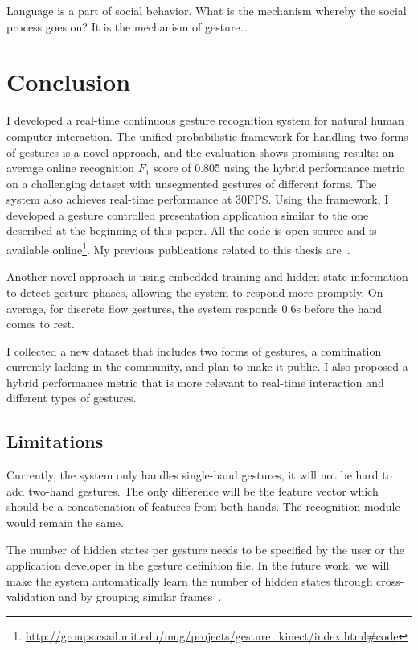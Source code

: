 \begin{savequote}
Language is a part of social behavior. What is the mechanism whereby the social
process goes on? It is the mechanism of gesture\ldots
{}
\end{savequote}
\chapter{Conclusion}
I developed a real-time continuous gesture recognition system for natural
human computer interaction. The
unified probabilistic framework for handling two forms of gestures is a novel
approach, and the evaluation shows promising results: an
average online recognition $F_1$ score of 0.805 using the hybrid performance
metric on a challenging dataset with unsegmented gestures of different forms.
The system also achieves real-time performance at 30FPS. Using the framework, I
developed a gesture controlled presentation application similar to the one described at the beginning of this paper. All the code is open-source
and is available
online\footnote{\url{http://groups.csail.mit.edu/mug/projects/gesture_kinect/index.html\#code}}.
My previous publications related to this thesis are~\cite{yin12, yin10, yin13,
yin14, yin13-making}.

Another novel approach is using embedded training and hidden state information
to detect gesture phases, allowing the system to respond more promptly. On
average, for discrete flow gestures, the system responds 0.6s before the hand comes to
rest. 

I collected a new dataset that includes two forms of gestures, a
combination currently lacking in the community, and plan to make it
public. I also proposed a hybrid performance metric
that is more relevant to real-time interaction and different types of gestures.

\section{Limitations}
Currently, the system only handles single-hand gestures, it will not be hard to
add two-hand gestures. The only difference will be the feature vector which
should be a concatenation of features from both hands. The recognition module
would remain the same.

The number of hidden states per gesture needs to be specified by the user or the
application developer in the gesture definition file. In the future work, we
will make the system automatically learn the number of hidden states through
cross-validation and by grouping similar frames~\cite{song13}.

